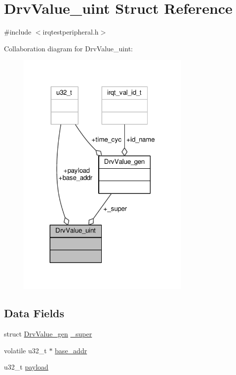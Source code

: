 \hypertarget{struct_drv_value__uint}{}\section{Drv\+Value\+\_\+uint Struct Reference}
\label{struct_drv_value__uint}


{\ttfamily \#include $<$irqtestperipheral.\+h$>$}



Collaboration diagram for Drv\+Value\+\_\+uint\+:\nopagebreak
\begin{figure}[H]
\begin{center}
\leavevmode
\includegraphics[width=239pt]{struct_drv_value__uint__coll__graph}
\end{center}
\end{figure}
\subsection*{Data Fields}
\begin{DoxyCompactItemize}
\item 
struct \hyperlink{struct_drv_value__gen}{Drv\+Value\+\_\+gen} \hyperlink{struct_drv_value__uint_ad6a22febddaa20faa4af2f9fed5766f0}{\+\_\+super}
\item 
volatile u32\+\_\+t $\ast$ \hyperlink{struct_drv_value__uint_af745320979cc5b64a90dda3de0bb6f9a}{base\+\_\+addr}
\item 
u32\+\_\+t \hyperlink{struct_drv_value__uint_a162d02c866faff1801fd317ce7edfdd7}{payload}
\end{DoxyCompactItemize}


